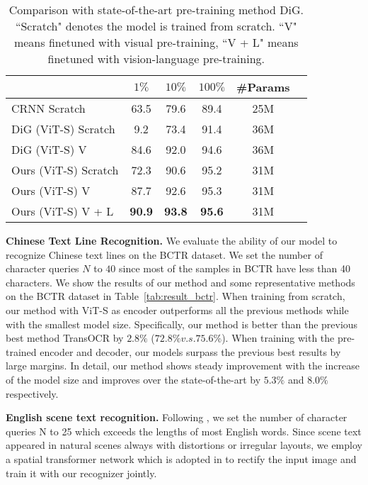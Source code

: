 \begin{table}[!t]
    \caption{Comparison with state-of-the-art pre-training method DiG. “Scratch"  denotes the model is trained from scratch. “V" means finetuned with visual pre-training, “V + L" means finetuned with vision-language pre-training.}
    \label{tab:eng_real}
    \setlength{\tabcolsep}{6pt}
    \centering
    \begin{tabular}{lccccc}
    \toprule
    &$1\%$ &$10\%$ &$100\%$ &\#Params \\
    \midrule
    CRNN Scratch &63.5 &79.6 &89.4 &25M \\ 
    \midrule
    DiG (ViT-S) Scratch  &9.2 &73.4 &91.4 &36M \\
    DiG (ViT-S) V &84.6 &92.0 &94.6 &36M \\
    \midrule
    Ours (ViT-S) Scratch  &72.3 &90.6 &95.2 &31M  \\
    Ours (ViT-S) V  &87.7 &92.6 &95.3 &31M  \\
    Ours (ViT-S) V + L  &\textbf{90.9} &\textbf{93.8} &\textbf{95.6} &31M  \\
    \bottomrule
    \end{tabular}
  \label{tab:tabe}
\end{table}


\vspace{2mm}
\noindent\textbf{Chinese Text Line Recognition.} We evaluate the ability of our model to recognize Chinese text lines on the BCTR dataset. We set the number of character queries $N$ to $40$ since most of the samples in BCTR have less than 40 characters. We show the results of our method and some representative methods on the BCTR dataset in Table~\ref{tab:result_bctr}. When training from scratch, our method with ViT-S as encoder outperforms all the previous methods while with the smallest model size. Specifically, our method is better than the previous best method TransOCR \cite{ChenLX21} by $2.8\%$ ($72.8\% v.s. 75.6\%$). When training with the pre-trained encoder and decoder, our models surpass the previous best results by large margins. In detail, our method shows steady improvement with the increase of the model size and improves over the state-of-the-art by $5.3\%$ and $8.0\%$ respectively.

\vspace{2mm}
\noindent\textbf{English scene text recognition.} Following \cite{shi2016end, shi2018aster}, we set the number of character queries N to 25 which exceeds the lengths of most English words. Since scene text appeared in natural scenes always with distortions or irregular layouts, we employ a spatial transformer network \cite{STN} which is adopted in \cite{shi2018aster} to rectify the input image and train it with our recognizer jointly. 



